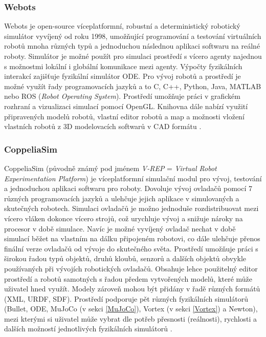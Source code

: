 \subsubsection{Webots} \label{Webots}
Webots \citep{Webots} je open-source víceplatformní, robustní a deterministický
robotický simulátor vyvíjený od roku 1998, umožňující programování a testování
virtuálních robotů mnoha různých typů a jednoduchou následnou aplikaci softwaru
na reálné roboty. Simulátor je možné použít pro simulaci prostředí s vícero
agenty najednou s možnostmi lokální i globální komunikace mezi agenty. Výpočty
fyzikálních interakcí zajišťuje fyzikální simulátor ODE. Pro vývoj robotů a
prostředí je možné využít řady programovacích jazyků a to C, C++, Python, Java,
MATLAB nebo ROS (\emph{Robot Operating System}). Prostředí umožňuje práci v
grafickém rozhraní a vizualizaci simulací pomocí OpenGL. Knihovna dále nabízí
využití připravených modelů robotů, vlastní editor robotů a map a možnosti
vložení vlastních robotů z 3D modelovacích softwarů v CAD formátu
\citep{michel2004cyberbotics}.

\subsubsection{CoppeliaSim} \label{CoppeliaSim}
CoppeliaSim \citep{coppeliaSim} \citep{coppeliarobotics} (původně známý pod
jménem \emph{V-REP} = \emph{Virtual Robot Experimentation Platform}) je
víceplatformní simulační modul pro vývoj, testování a jednoduchou aplikaci
softwaru pro roboty. Dovoluje vývoj ovladačů pomocí 7 různých programovacích
jazyků a ulehčuje jejich aplikace v simulovaných a skutečných robotech.
Simulaci ovladačů je možno jednoduše rozdistribuovat mezi vícero vláken dokonce
vícero strojů, což urychluje vývoj a snižuje nároky na procesor v době
simulace. Navíc je možné vyvíjený ovladač nechat v době simulací běžet na
vlastním na dálku připojeném robotovi, co dále ulehčuje přenos finální verze
ovladačů od vývoje do skutečného světa. Prostředí umožňuje práci s širokou
řadou typů objektů, druhů kloubů, senzorů a dalších objektů obvykle používaných
při vývojích robotických ovladačů. Obsahuje lehce použitelný editor prostředí a
robotů samotných s řadou předem vytvořených modelů, které může uživatel hned
využít. Modely zároveň mohou být přidány v řadě různých formátů (XML, URDF,
SDF). Prostředí podporuje pět různých fyzikálních simulátorů (Bullet, ODE,
MuJoCo (v sekci \ref{MuJoCo}), Vortex (v sekci \ref{Vortex}) a Newton), mezi
kterými si uživatel může vybrat dle potřeb přesnosti (reálnosti), rychlosti a
dalších možností jednotlivých fyzikálních simulátorů
\citep{nogueira2014comparative}.

